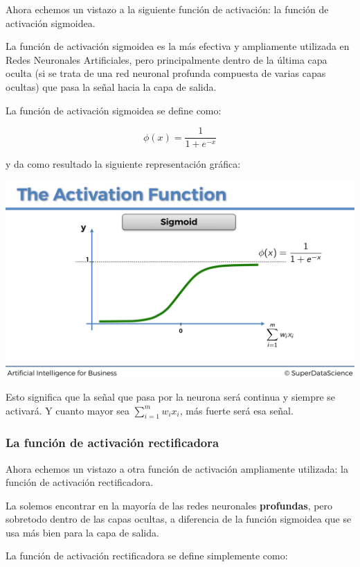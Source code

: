\documentclass[
]{book}
\begin{document}
Ahora echemos un vistazo a la siguiente función de activación: la función de activación sigmoidea.

La función de activación sigmoidea es la más efectiva y ampliamente utilizada en Redes Neuronales Artificiales, pero principalmente dentro de la última capa oculta (si se trata de una red neuronal profunda compuesta de varias capas ocultas) que pasa la señal hacia la capa de salida.

La función de activación sigmoidea se define como:

\[\phi(x) = \frac{1}{1+e^{-x}}\]

y da como resultado la siguiente representación gráfica:

\includegraphics{Images/ANN_11.png}

Esto significa que la señal que pasa por la neurona será continua y siempre se activará. Y cuanto mayor sea \(\sum_{i = 1}^m w_i x_i\), más fuerte será esa señal.

\hypertarget{la-funciuxf3n-de-activaciuxf3n-rectificadora}{%
\subsubsection{La función de activación rectificadora}\label{la-funciuxf3n-de-activaciuxf3n-rectificadora}}

Ahora echemos un vistazo a otra función de activación ampliamente utilizada: la función de activación rectificadora.

La solemos encontrar en la mayoría de las redes neuronales \textbf{profundas}, pero sobretodo dentro de las capas ocultas, a diferencia de la función sigmoidea que se usa más bien para la capa de salida.

La función de activación rectificadora se define simplemente como:
\end{document}
